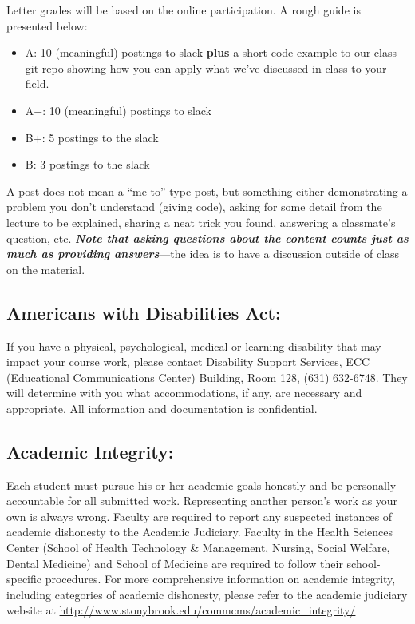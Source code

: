 \documentclass[11pt]{article}
\begin{document}
\noindent Letter grades will be based on the online participation.  A
rough guide is presented below:
\begin{itemize}
\item {\sf A\phantom{+}}: 10 (meaningful) postings to slack {\bf plus}
  a short code example to our class git repo showing how you can apply what
  we've discussed in class to your field.

\item {\sf A$-$}: 10 (meaningful) postings to slack

\item {\sf B$+$}: 5 postings to the slack

\item {\sf B\phantom{+}}:  3 postings to the slack
\end{itemize}
A post does not mean a ``me to''-type post, but something either
demonstrating a problem you don't understand (giving code), asking for
some detail from the lecture to be explained, sharing a neat trick you
found, answering a classmate's question, etc.  {\em \bfseries Note that asking
questions about the content counts just as much as providing
answers}---the idea is to have a discussion outside of class on the
material.



\subsection*{Americans with Disabilities Act: }

\noindent If you have a physical, psychological, medical or learning
disability that may impact your course work, please contact Disability
Support Services, ECC (Educational Communications Center) Building,
Room 128, (631) 632-6748. They will determine with you what
accommodations, if any, are necessary and appropriate. All information
and documentation is confidential.



\subsection*{Academic Integrity: }

\noindent Each student must pursue his or her academic goals honestly
and be personally accountable for all submitted work.  Representing
another person's work as your own is always wrong.  Faculty are
required to report any suspected instances of academic dishonesty to
the Academic Judiciary. Faculty in the Health Sciences Center (School
of Health Technology \& Management, Nursing, Social Welfare, Dental
Medicine) and School of Medicine are required to follow their
school-specific procedures. For more comprehensive information on
academic integrity, including categories of academic dishonesty,
please refer to the academic judiciary website at
\url{http://www.stonybrook.edu/commcms/academic_integrity/}
\end{document}
